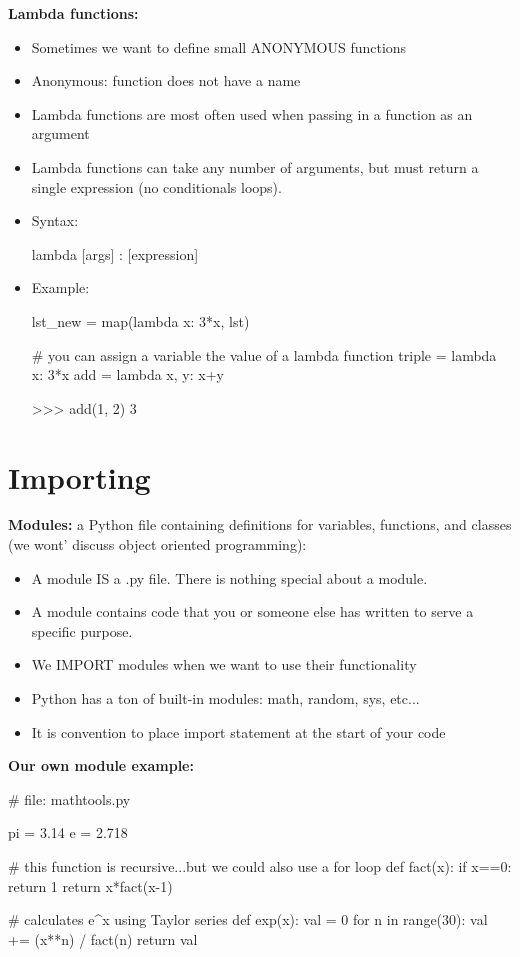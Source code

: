 \documentclass[12pt]{article}
\numberwithin{equation}{section}
\begin{document}
\textbf{Lambda functions:}
\begin{itemize}
    \item Sometimes we want to define small ANONYMOUS functions
    \item Anonymous: function does not have a name
    \item Lambda functions are most often used when passing in a function as an argument
    \item Lambda functions can take any number of arguments, but must return a single expression (no conditionals loops).
    \item Syntax:
    \begin{python}
    lambda [args] : [expression]
    \end{python}
    \item Example:
    \begin{python}
    lst_new = map(lambda x: 3*x, lst)
    
    # you can assign a variable the value of a lambda function
    triple = lambda x: 3*x
    add = lambda x, y: x+y
    
    >>> add(1, 2)
    3
    \end{python}
\end{itemize}

\section{Importing}

\textbf{Modules:} a Python file containing definitions for variables, functions, and classes (we wont' discuss object oriented programming):
\begin{itemize}
	\item A module IS a .py file. There is nothing special about a module.
	\item A module contains code that you or someone else has written to serve a specific purpose.
	\item We IMPORT modules when we want to use their functionality
	\item Python has a ton of built-in modules: math, random, sys, etc...
	\item It is convention to place import statement at the start of your code
\end{itemize}

\textbf{Our own module example:}
\begin{python}
# file: mathtools.py

pi = 3.14
e = 2.718

# this function is recursive...but we could also use a for loop
def fact(x):
	if x==0:
		return 1
	return x*fact(x-1)

# calculates e^x using Taylor series
def exp(x):
	val = 0
	for n in range(30):
		val += (x**n) / fact(n)
	return val
\end{python}
\end{document}

